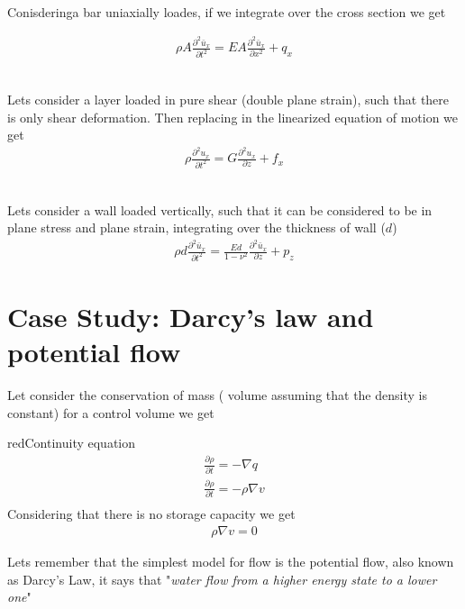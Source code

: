 \documentclass[a4paper, 11pt,article,oneside]{memoir}%
\begin{document}
{}\\
Conisderinga bar uniaxially loades, if we integrate over the cross section we get

\begin{gather*}
\rho A\frac{\partial^2\bar{u}_x}{\partial t^2}=EA\frac{\partial^2 \bar{u}_x}{\partial x^2}+q_x
\end{gather*}


{}\\
Lets consider a layer loaded in pure shear (double plane strain), such that there is only shear deformation.
Then replacing in the linearized equation of motion we get 
\begin{gather*}
\rho \frac{\partial^2 u_x}{\partial t^2}=G\frac{\partial^2 u_x}{\partial z}+f_x
\end{gather*}


{}\\
Lets consider a wall loaded vertically, such that it can be considered to be in plane stress and plane strain, integrating over the thickness of wall ($d$)
\begin{gather*}
\rho d \frac{\partial^2 \bar{u}_x}{\partial t^2}=\frac{Ed}{1-\nu^2}\frac{\partial^2 \bar{u}_x}{\partial z}+p_z
\end{gather*}
\newpage
\section{Case Study: Darcy's law and potential flow}
Let consider the conservation of mass ( volume assuming that the density is constant) for a control volume we get  
\begin{eqbox2}{red}{Continuity equation}
\begin{gather*}
\frac{\partial \rho}{\partial t}=-\nabla q\\
\frac{\partial \rho}{\partial t}=-\rho \nabla v\\
\end{gather*}
Considering that there is no storage capacity we get
\begin{gather*}
\rho \nabla v=0
\end{gather*}
\end{eqbox2}

Lets remember that the simplest model for flow is the potential flow, also known as Darcy's Law, it says that "\textit{water flow from a higher energy state to a lower one}"
\end{document}
